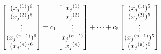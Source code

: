 \documentclass[preview]{standalone}
\begin{document}
\begin{align*}
\special{dvisvgm:raw <g id='unique000'>}\begin{bmatrix}({x_j}^{(1)})^6\\({x_j}^{(2)})^6\\\vdots\\({x_j}^{(n-1)})^6\\({x_j}^{(n)})^6\end{bmatrix}=c_1\begin{bmatrix}{x_j}^{(1)}\\{x_j}^{(2)}\\\vdots\\{x_j}^{(n-1)}\\{x_j}^{(n)}\end{bmatrix}+\cdots+c_5\begin{bmatrix}({x_j}^{(1)})^5\\({x_j}^{(2)})^5\\\vdots\\({x_j}^{(n-1)})^5\\({x_j}^{(n)})^5\end{bmatrix}\special{dvisvgm:raw </g>}
\end{align*}
\end{document}

